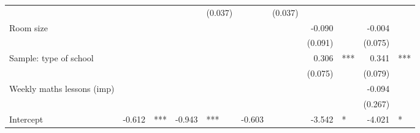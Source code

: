 \documentclass{article}
\begin{document}
\begin{table}[!h]
\begin{tabular}{lllllllllll}
  \multicolumn{1}{r}{} &
  \multicolumn{1}{l}{} &
  \multicolumn{1}{r}{} &
  \multicolumn{1}{l}{} &
  \multicolumn{1}{r}{(0.037)} &
  \multicolumn{1}{l}{} &
  \multicolumn{1}{r}{(0.037)} &
  \multicolumn{1}{l}{} \\
\multicolumn{1}{l}{Room size} &
  \multicolumn{1}{r}{} &
  \multicolumn{1}{l}{} &
  \multicolumn{1}{r}{} &
  \multicolumn{1}{l}{} &
  \multicolumn{1}{r}{} &
  \multicolumn{1}{l}{} &
  \multicolumn{1}{r}{-0.090} &
  \multicolumn{1}{l}{} &
  \multicolumn{1}{r}{-0.004} &
  \multicolumn{1}{l}{} \\
\multicolumn{1}{l}{} &
  \multicolumn{1}{r}{} &
  \multicolumn{1}{l}{} &
  \multicolumn{1}{r}{} &
  \multicolumn{1}{l}{} &
  \multicolumn{1}{r}{} &
  \multicolumn{1}{l}{} &
  \multicolumn{1}{r}{(0.091)} &
  \multicolumn{1}{l}{} &
  \multicolumn{1}{r}{(0.075)} &
  \multicolumn{1}{l}{} \\
\multicolumn{1}{l}{Sample: type of school} &
  \multicolumn{1}{r}{} &
  \multicolumn{1}{l}{} &
  \multicolumn{1}{r}{} &
  \multicolumn{1}{l}{} &
  \multicolumn{1}{r}{} &
  \multicolumn{1}{l}{} &
  \multicolumn{1}{r}{0.306} &
  \multicolumn{1}{l}{***} &
  \multicolumn{1}{r}{0.341} &
  \multicolumn{1}{l}{***} \\
\multicolumn{1}{l}{} &
  \multicolumn{1}{r}{} &
  \multicolumn{1}{l}{} &
  \multicolumn{1}{r}{} &
  \multicolumn{1}{l}{} &
  \multicolumn{1}{r}{} &
  \multicolumn{1}{l}{} &
  \multicolumn{1}{r}{(0.075)} &
  \multicolumn{1}{l}{} &
  \multicolumn{1}{r}{(0.079)} &
  \multicolumn{1}{l}{} \\
\multicolumn{1}{l}{Weekly maths lessons (imp)} &
  \multicolumn{1}{r}{} &
  \multicolumn{1}{l}{} &
  \multicolumn{1}{r}{} &
  \multicolumn{1}{l}{} &
  \multicolumn{1}{r}{} &
  \multicolumn{1}{l}{} &
  \multicolumn{1}{r}{} &
  \multicolumn{1}{l}{} &
  \multicolumn{1}{r}{-0.094} &
  \multicolumn{1}{l}{} \\
\multicolumn{1}{l}{} &
  \multicolumn{1}{r}{} &
  \multicolumn{1}{l}{} &
  \multicolumn{1}{r}{} &
  \multicolumn{1}{l}{} &
  \multicolumn{1}{r}{} &
  \multicolumn{1}{l}{} &
  \multicolumn{1}{r}{} &
  \multicolumn{1}{l}{} &
  \multicolumn{1}{r}{(0.267)} &
  \multicolumn{1}{l}{} \\
\multicolumn{1}{l}{Intercept} &
  \multicolumn{1}{r}{-0.612} &
  \multicolumn{1}{l}{***} &
  \multicolumn{1}{r}{-0.943} &
  \multicolumn{1}{l}{***} &
  \multicolumn{1}{r}{-0.603} &
  \multicolumn{1}{l}{} &
  \multicolumn{1}{r}{-3.542} &
  \multicolumn{1}{l}{*} &
  \multicolumn{1}{r}{-4.021} &
  \multicolumn{1}{l}{*} \\

\end{tabular}
\end{table}
\end{document}
